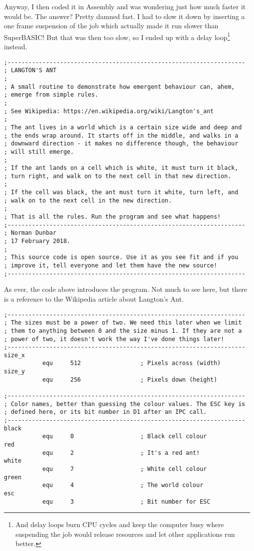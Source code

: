 Anyway, I then coded it in Assembly and was wondering just how much faster it would be. The answer? Pretty damned fast. I had to slow it down by inserting a one frame suspension of the job which actually made it run slower than SuperBASIC! But that was then too slow, so I ended up with a delay loop\footnote{And delay loops burn CPU cycles and keep the computer busy where suspending the job would release resources and let other applications run better.} instead.

\begin{lstlisting}[firstnumber=1,caption={Langtons Ant - Opening Blurb}]
;--------------------------------------------------------------------
; LANGTON'S ANT
;
; A small routine to demonstrate how emergent behaviour can, ahem,
; emerge from simple rules.
;
; See Wikipedia: https://en.wikipedia.org/wiki/Langton's_ant
;
; The ant lives in a world which is a certain size wide and deep and
; the ends wrap around. It starts off in the middle, and walks in a
; downward direction - it makes no difference though, the behaviour
; will still emerge.
;
; If the ant lands on a cell which is white, it must turn it black,
; turn right, and walk on to the next cell in that new direction.
;
; If the cell was black, the ant must turn it white, turn left, and
; walk on to the next cell in the new direction.
;
; That is all the rules. Run the program and see what happens!
;--------------------------------------------------------------------
; Norman Dunbar
; 17 February 2018.
;
; This source code is open source. Use it as you see fit and if you
; improve it, tell everyone and let them have the new source!
;--------------------------------------------------------------------
\end{lstlisting}

As ever, the code above introduces the program. Not much to see here, but there is a reference to the Wikipedia article about Langton's Ant.

\begin{lstlisting}[firstnumber=last,caption={Langtons Ant - Equates}]
;--------------------------------------------------------------------
; The sizes must be a power of two. We need this later when we limit
; them to anything between 0 and the size minus 1. If they are not a
; power of two, it doesn't work the way I've done things later!
;--------------------------------------------------------------------
size_x
           equ     512                 ; Pixels across (width)
size_y
           equ     256                 ; Pixels down (height)

;--------------------------------------------------------------------
; Color names, better than guessing the colour values. The ESC key is
; defined here, or its bit number in D1 after an IPC call.
;--------------------------------------------------------------------
black
           equ     0                   ; Black cell colour
red
           equ     2                   ; It's a red ant!
white
           equ     7                   ; White cell colour
green
           equ     4                   ; The world colour
esc
           equ     3                   ; Bit number for ESC
\end{lstlisting}

